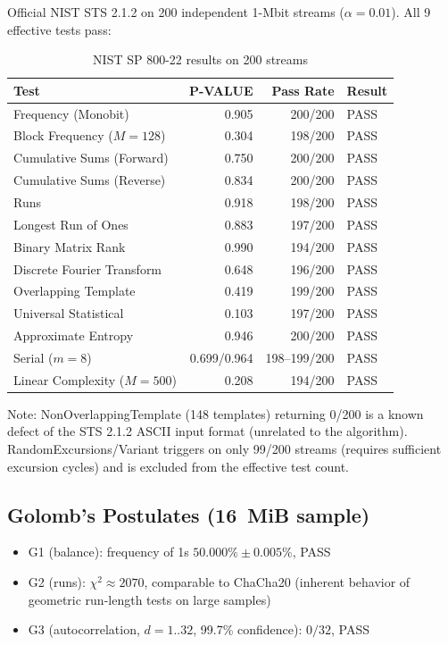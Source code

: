 \documentclass[11pt,a4paper]{article}
\begin{document}
Official NIST STS 2.1.2 \cite{nist} on 200 independent 1-Mbit streams
($\alpha = 0.01$). All 9 effective tests pass:

\begin{table}[H]
\centering
\begin{tabular}{@{}lrrl@{}}
\toprule
\textbf{Test} & \textbf{P-VALUE} & \textbf{Pass Rate} & \textbf{Result} \\
\midrule
Frequency (Monobit)        & 0.905 & 200/200 & PASS \\
Block Frequency ($M{=}128$)& 0.304 & 198/200 & PASS \\
Cumulative Sums (Forward)  & 0.750 & 200/200 & PASS \\
Cumulative Sums (Reverse)  & 0.834 & 200/200 & PASS \\
Runs                       & 0.918 & 198/200 & PASS \\
Longest Run of Ones        & 0.883 & 197/200 & PASS \\
Binary Matrix Rank         & 0.990 & 194/200 & PASS \\
Discrete Fourier Transform & 0.648 & 196/200 & PASS \\
Overlapping Template       & 0.419 & 199/200 & PASS \\
Universal Statistical      & 0.103 & 197/200 & PASS \\
Approximate Entropy        & 0.946 & 200/200 & PASS \\
Serial ($m{=}8$)           & 0.699/0.964 & 198--199/200 & PASS \\
Linear Complexity ($M{=}500$) & 0.208 & 194/200 & PASS \\
\bottomrule
\end{tabular}
\caption{NIST SP 800-22 results on 200 streams}
\label{tab:nist200}
\end{table}

Note: NonOverlappingTemplate (148 templates) returning 0/200 is a known defect
of the STS 2.1.2 ASCII input format (unrelated to the algorithm).
RandomExcursions/Variant triggers on only 99/200 streams (requires sufficient
excursion cycles) and is excluded from the effective test count.

\subsection{Golomb's Postulates (16~MiB sample)}

\begin{itemize}
\item G1 (balance): frequency of 1s $50.000\% \pm 0.005\%$, PASS
\item G2 (runs): $\chi^2 \approx 2070$, comparable to ChaCha20 (inherent
  behavior of geometric run-length tests on large samples)
\item G3 (autocorrelation, $d{=}1..32$, 99.7\% confidence): $0/32$, PASS
\end{itemize}
\end{document}
